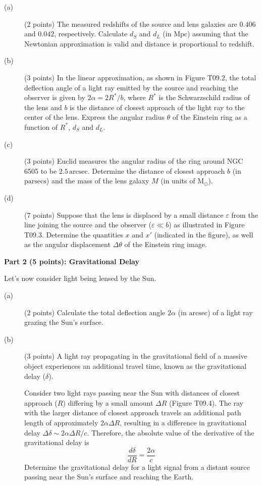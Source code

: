 \begin{description}
\item[(a)] (2 points) The measured redshifts of the source and lens galaxies
  are $0.406$ and $0.042$, respectively. Calculate $d_S$ and $d_L$ (in
  $\mathrm{Mpc}$) assuming that the Newtonian approximation is valid and
  distance is proportional to redshift.
\item[(b)] (3 points) In the linear approximation, as shown in Figure T09.2,
  the total deflection angle of a light ray emitted by the source and reaching
  the observer is given by $2\alpha = 2R^*/b$, where $R^*$ is the
  Schwarzschild radius of the lens and $b$ is the distance of closest approach
  of the light ray to the center of the lens. Express the angular radius
  $\theta$ of the Einstein ring as a function of $R^*$, $d_S$ and $d_L$.


\item[(c)] (3 points) Euclid measures the angular radius of the ring around
  NGC 6505 to be $2.5\,\mathrm{arcsec}$. Determine the distance of closest
  approach $b$ (in $\mathrm{parsecs}$) and the mass of the lens galaxy $M$ (in
  units of $\mathrm{M}_\odot$).
\item[(d)] (7 points) Suppose that the lens is displaced by a small distance
  $\varepsilon$ from the line joining the source and the observer
  ($\varepsilon \ll b$) as illustrated in Figure T09.3. Determine the
  quantities $x$ and $x'$ (indicated in the figure), as well as the angular
  displacement $\Delta\theta$ of the Einstein ring image.
\end{description}

\medskip\noindent\textbf{Part 2 (5 points): Gravitational Delay}

Let's now consider light being lensed by the Sun.

\begin{description}
\item[(a)] (2 points) Calculate the total deflection angle $2\alpha$ (in
  $\mathrm{arcsec}$) of a light ray grazing the Sun's surface.
\item[(b)] (3 points) A light ray propagating in the gravitational field of a
  massive object experiences an additional travel time, known as the
  gravitational delay ($\delta$).


  Consider two light rays passing near the Sun with distances of closest
  approach ($R$) differing by a small amount $\Delta R$ (Figure T09.4). The ray
  with the larger distance of closest approach travels an additional path
  length of approximately $2\alpha\Delta R$, resulting in a difference in
  gravitational delay $\Delta\delta \sim 2\alpha\Delta R/c$. Therefore, the
  absolute value of the derivative of the gravitational delay is
  \[ \frac{d\delta}{dR} = \frac{2\alpha}{c} \]
  Determine the gravitational delay for a light signal from a distant source
  passing near the Sun's surface and reaching the Earth.
\end{description}

